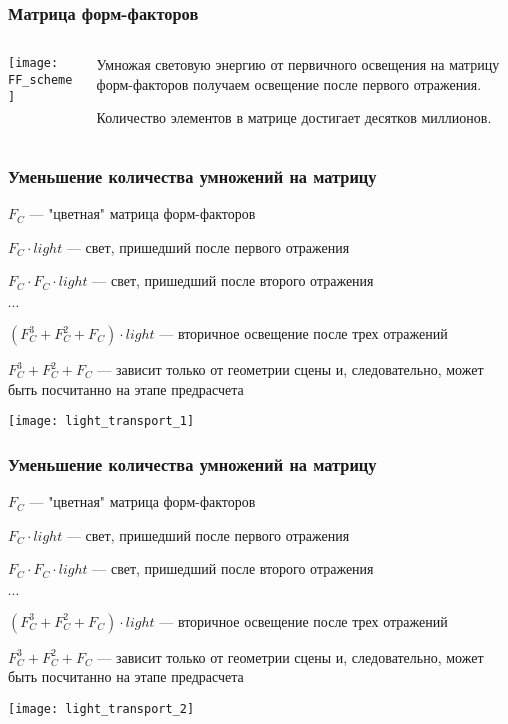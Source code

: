 \documentclass[unicode, dvipsnames]{beamer}
\begin{document}
\begin{frame}
	\frametitle{Матрица форм-факторов}
	\begin{columns}[T]
    	\begin{column}[T]{5cm}
			\texttt{[image: FF\_scheme]}
    	\end{column}
    	\begin{column}[T]{5cm}
			Умножая световую энергию от первичного освещения на матрицу форм-факторов получаем освещение после первого отражения.
			
			Количество элементов в матрице достигает десятков миллионов.
	    \end{column}
    \end{columns}
\end{frame}

\begin{frame}
	\frametitle{Уменьшение количества умножений на матрицу}
	$F_C$ --- "цветная" матрица форм-факторов
	
	$F_C \cdot light$ --- свет, пришедший после первого отражения

	$F_C \cdot F_C \cdot light$ --- свет, пришедший после второго отражения
	
	$\cdots$
	
	$(F_C^3 + F_C^2 + F_C) \cdot light$ --- вторичное освещение после трех отражений
	
	$F_C^3 + F_C^2 + F_C$ --- зависит только от геометрии сцены и, следовательно, может быть посчитанно на этапе предрасчета
	
	\center
	\texttt{[image: light\_transport\_1]}
\end{frame}

\begin{frame}
	\frametitle{Уменьшение количества умножений на матрицу}
	$F_C$ --- "цветная" матрица форм-факторов
	
	$F_C \cdot light$ --- свет, пришедший после первого отражения

	$F_C \cdot F_C \cdot light$ --- свет, пришедший после второго отражения
	
	$\cdots$
	
	$(F_C^3 + F_C^2 + F_C) \cdot light$ --- вторичное освещение после трех отражений
	
	$F_C^3 + F_C^2 + F_C$ --- зависит только от геометрии сцены и, следовательно, может быть посчитанно на этапе предрасчета
	
	\center
	\texttt{[image: light\_transport\_2]}
\end{frame}
\end{document}
